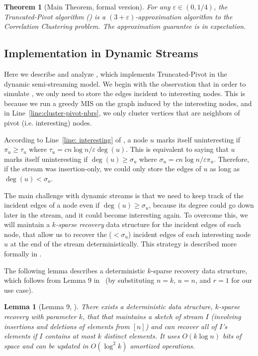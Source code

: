 \documentclass[10pt,a4paper]{article}
\newtheorem{theorem}{Theorem}[section]
\newtheorem{lemma}{Lemma}[section]
\newcommand{\truncatedpivot}{\textrm{Truncated-Pivot}\xspace}
\newcommand{\eps}{\ensuremath{\varepsilon}}
\begin{document}
\begin{theorem}[Main Theorem, formal version]\label{cor: parallelApproximation}
    For any $\eps \in (0,1/4)$, the \truncatedpivot algorithm () is a $(3 + \eps)$-approximation algorithm to the Correlation Clustering problem. 
    The approximation guarantee is in expectation. 
\end{theorem}

\subsection{Implementation in Dynamic Streams}

{
Here we describe and analyze , which implements \truncatedpivot in the dynamic semi-streaming model. We begin with the observation that in order to simulate , we only need to store the edges incident to interesting nodes. This is because we run a greedy MIS on the graph induced by the interesting nodes, and in Line~\ref{line:cluster-pivot-nbrs}, we only cluster vertices that are neighbors of pivot (i.e. interesting) nodes.

According to Line~\ref{line: interesting} of , a node $u$ marks itself uninteresting if $\pi_{u} \geq \tau_{u}$ where $\tau_{u} = c n\log n / \eps \deg(u)$. This is equivalent to saying that $u$ marks itself uninteresting if $\deg(u) \geq \sigma_{u}$ where $\sigma_{u} = c n\log n / \eps \pi_u$. Therefore, if the stream was insertion-only, we could only store the edges of $u$ as long as $\deg(u) < \sigma_{u}$.

The main challenge with dynamic streams is that we need to keep track of the incident edges of a node even if $\deg(u) \geq \sigma_{u}$, because its degree could go down later in the stream, and it could become interesting again. To overcome this, we will maintain a \emph{$k$-sparse recovery} data structure for the incident edges of each node, that allow us to recover the ($<\sigma_u$) incident edges of each interesting node $u$ at the end of the stream deterministically. This strategy is described more formally in . 

The following lemma describes a deterministic $k$-sparse recovery data structure, which follows from Lemma 9 in~\cite{DBLP:journals/tcs/BarkayPS15} (by substituting $n = k$, $u = n$, and $r = 1$ for our use case).

\begin{lemma}[Lemma 9, \cite{DBLP:journals/tcs/BarkayPS15}]\label{lem: k-sparse-recovery}
    There exists a deterministic data structure, $k$-sparse recovery with parameter $k$, that that maintains a sketch of stream $I$ (involving insertions and deletions of elements from $[n]$) and can recover all of $I$’s elements if $I$ contains at most $k$ distinct elements. It uses $O(k \log n)$ bits of space and can be updated in $O(\log^2 k)$ amortized operations.
\end{lemma}

}
\end{document}
